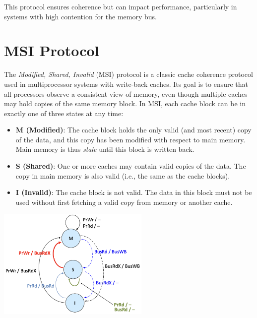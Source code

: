 This protocol ensures coherence but can impact performance, particularly in systems with high contention for the memory bus.

\section{MSI Protocol}
The \emph{Modified, Shared, Invalid} (MSI) protocol is a classic cache coherence protocol
used in multiprocessor systems with write-back caches. Its goal is to ensure that all
processors observe a consistent view of memory, even though multiple caches may hold
copies of the same memory block. In MSI, each cache block can be in exactly one of
three states at any time:

\begin{itemize}
  \item \textbf{M (Modified)}:
        The cache block holds the only valid (and most recent) copy of the data,
        and this copy has been modified with respect to main memory. Main memory
        is thus \emph{stale} until this block is written back.
  \item \textbf{S (Shared)}:
        One or more caches may contain valid copies of the data. The copy in main
        memory is also valid (i.e., the same as the cache blocks).
  \item \textbf{I (Invalid)}:
        The cache block is not valid. The data in this block must not be used
        without first fetching a valid copy from memory or another cache.
\end{itemize}

\begin{center}
    \includegraphics[width=0.55\textwidth]{chapters/chapter5a/images/msi.png}
\end{center}

